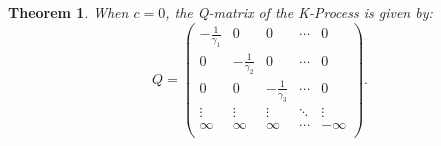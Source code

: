 \documentclass[a1,portrait]{a0poster}
\newtheorem{teorema}{Theorem}
\begin{document}
\begin{textblock}{15}
  \begin{teorema}
    When $c = 0$, the Q-matrix of the K-Process is given by:
    \begin{displaymath}
      Q = \left(
        \begin{array}{ccccc}
          -\frac{1}{\gamma_1} & 0 & 0 & \cdots & 0\\
          0 & -\frac{1}{\gamma_2} & 0 & \cdots & 0\\
          0 & 0 & -\frac{1}{\gamma_3} & \cdots & 0\\
          \vdots & \vdots & \vdots & \ddots & \vdots \\
          \infty & \infty & \infty & \cdots & -\infty\\
        \end{array}
      \right).
    \end{displaymath}
  \end{teorema}
\end{textblock}
\end{document}
